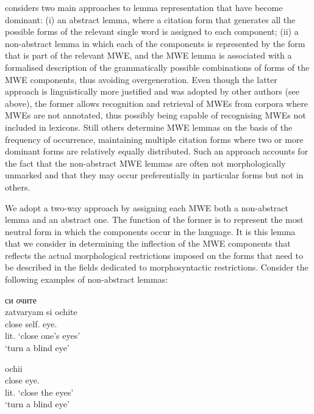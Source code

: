 \documentclass[output=paper,colorlinks,citecolor=brown]{langscibook}
\begin{document}
\citet{Savary2008} considers two main approaches to lemma representation that have become dominant: (i) an abstract lemma, where a citation form that generates all the possible forms of the relevant single word is assigned to each component; (ii) a non-abstract lemma in which each of the components is represented by the form that is part of the relevant MWE, and the MWE lemma is associated with a formalised description of the grammatically possible combinations of forms of the MWE components, thus avoiding overgeneration. Even though the latter approach is linguistically more justified and was adopted by other authors (see  above), the former allows recognition and retrieval of MWEs from corpora where MWEs are not annotated, thus possibly being capable of recognising MWEs not included in lexicons. %
Still others \citep{fellbaum2005} determine MWE lemmas on the basis of the frequency of occurrence, maintaining multiple citation forms where two or more dominant forms are relatively equally distributed. Such an approach accounts for the fact that the non-abstract MWE lemmas are often not morphologically unmarked and that they may occur preferentially in particular forms but not in others. 

We adopt a two-way approach by assigning each MWE both a non-abstract lemma and an abstract one. The function of the former is to represent the most neutral form in which the components occur in the language. It is this lemma that we consider in determining the inflection of the MWE components that reflects the actual morphological restrictions imposed on the forms that need to be described in the fields dedicated to morphosyntactic restrictions. Consider the following examples of non-abstract lemmas:


\begin{exe}
\ex \label{bg:zatvaryam-si-ochite0}
\settowidth {}
         {си} {очите} \\
    zatvaryam si ochite\\ 
    close self. eye.\\  
		\glt lit. `close one's eyes' 
\\ `turn a blind eye'

\ex \label{ro:închide ochii0}
\settowidth {}
 {ochii} \\ 
close eye. \\ 
\glt lit. `close the eyes'
 \\ `turn a blind eye'
\end{exe}
\end{document}
